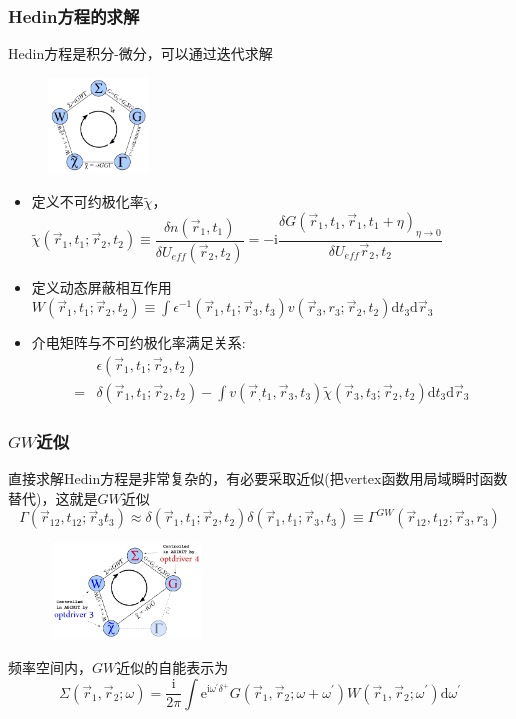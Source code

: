 \documentclass[cjk,slidestop,compress,mathserif,blue]{beamer}
\begin{document}
\frame
{
	\frametitle{\textrm{Hedin}方程的求解} 
	\textrm{Hedin}方程是积分-微分，可以通过迭代求解
\begin{figure}[h!]
\centering
\vspace{-10pt}
\includegraphics[height=1.0in,width=1.05in,viewport=5 5 330 335,clip]{Figures/GW-1.png}
\label{GW-1}
\end{figure}
	\begin{itemize}
			\vspace{-15pt}
		\item 定义不可约极化率$\tilde\chi$，$\tilde\chi(\vec r_1,t_1;\vec r_2,t_2)\equiv\dfrac{\delta n(\vec r_1,t_1)}{\delta U_{eff}(\vec r_2,t_2)}=-\mathrm{i}\dfrac{\delta G(\vec r_1,t_1,\vec r_1,t_1+\eta)_{\eta\rightarrow0}}{\delta U_{eff}{\vec r_2,t_2}}$
		\item 定义动态屏蔽相互作用$W(\vec r_1,t_1;\vec r_2,t_2)\equiv\int\epsilon^{-1}(\vec r_1,t_1;\vec r_3,t_3)v(\vec r_3,r_3;\vec r_2,t_2)\mathrm{d}t_3\mathrm{d}\vec r_3$
		\item 介电矩阵与不可约极化率满足关系:
			\begin{displaymath}
				\begin{aligned}
					&\epsilon(\vec r_1,t_1;\vec r_2,t_2)\\
					=&\delta(\vec r_1,t_1;\vec r_2,t_2)-\int v(\vec r_,t_1,\vec r_3,t_3)\tilde\chi(\vec r_3,t_3;\vec r_2,t_2)\mathrm{d}t_3\mathrm{d}\vec r_3
				\end{aligned}
			\end{displaymath}
	\end{itemize}

}

\frame
{
	\frametitle{$GW$近似}
	直接求解\textrm{Hedin}方程是非常复杂的，有必要采取近似(把\textrm{vertex}函数用局域瞬时函数替代)，这就是$GW$近似
	$$\Gamma(\vec r_{12},t_{12};\vec r_3t_3)\approx\delta(\vec r_1,t_1;\vec r_2,t_2)\delta(\vec r_1,t_1;\vec r_3,t_3)\equiv\Gamma^{GW}(\vec r_{12},t_{12};\vec r_3,r_3)$$
\begin{figure}[h!]
\centering
\vspace{-15pt}
\includegraphics[height=1.0in,width=1.65in,viewport=5 5 530 320,clip]{Figures/GW-3.png}
\label{GW-2}
\end{figure}
频率空间内，$GW$近似的自能表示为
$$\Sigma(\vec r_1,\vec r_2;\omega)=\dfrac{\mathrm i}{2\pi}\int \mathrm e^{\mathrm i\omega^{\prime}\delta^+}G(\vec r_1,\vec r_2;\omega+\omega^{\prime})W(\vec r_1,\vec r_2;\omega^{\prime})\mathrm{d}\omega^{\prime}$$
}
\end{document}
